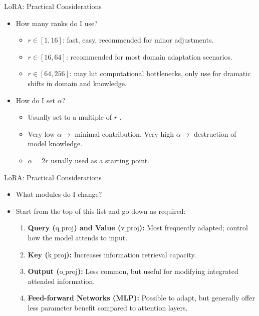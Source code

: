 \documentclass[24pt]{beamer}
\begin{document}
\begin{frame}
   	\sectionpage
   	\subsectionpage
\end{frame}

\begin{frame}
{LoRA: Practical Considerations}
    \begin{itemize}
        \item How many ranks do I use?
        \begin{itemize}
            \item $r \in [1,16]$: fast, easy, recommended for minor
            adjustments. \item $r \in [16,64]$: recommended for most domain
            adaptation scenarios. \item $r \in [64, 256]$: may hit
            computational bottlenecks, only use for dramatic shifts in
            domain and knowledge.
        \end{itemize}

        \item How do I set $\alpha$?
        \begin{itemize}
            \item Usually set to a multiple of $r$ . \item Very low
            $\alpha \rightarrow$ minimal contribution. Very high
            $\alpha \rightarrow$ destruction of model knowledge. \item
            $\alpha = 2r$ usually used as a starting point.
        \end{itemize}
    \end{itemize}
\end{frame}

\begin{frame}
{LoRA: Practical Considerations}
    \begin{itemize}
        \item What modules do I change? \item Start from the top of this
        list and go down as required:
        \begin{enumerate}
            \item
            \textbf{Query ($\text{q\_proj}$) and Value ($\text{v\_proj}$):}
            Most frequently adapted; control \alert{how the model attends}
            to input. \item \textbf{Key ($\text{k\_proj}$):} Increases
            \alert{information retrieval} capacity. \item
            \textbf{Output ($\text{o\_proj}$):} Less common, but useful for
            modifying \alert{integrated} attended information. \item
            \textbf{Feed-forward Networks (MLP):} Possible to adapt, but
            generally offer less parameter benefit compared to attention
            layers.
        \end{enumerate}
    \end{itemize}
\end{frame}
\end{document}
